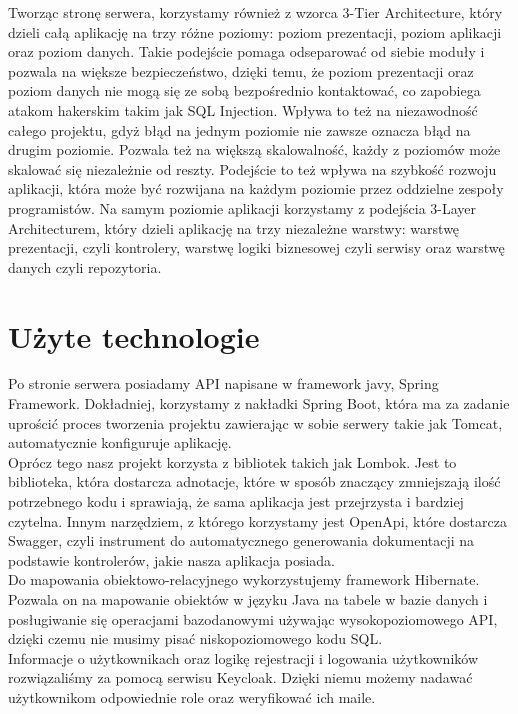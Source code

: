 \documentclass{article}
\begin{document}
Tworząc stronę serwera, korzystamy również z wzorca 3-Tier Architecture, który dzieli całą aplikację na trzy różne poziomy: poziom prezentacji, poziom aplikacji oraz poziom danych. Takie podejście pomaga odseparować od siebie moduły i pozwala na większe bezpieczeństwo, dzięki temu, że poziom prezentacji oraz poziom danych nie mogą się ze sobą bezpośrednio kontaktować, co zapobiega atakom hakerskim takim jak SQL Injection. Wpływa to też na niezawodność całego projektu, gdyż błąd na jednym poziomie nie zawsze oznacza błąd na drugim poziomie. Pozwala też na większą skalowalność, każdy z poziomów może skalować się niezależnie od reszty. Podejście to też wpływa na szybkość rozwoju aplikacji, która może być rozwijana na każdym poziomie przez oddzielne zespoły programistów. Na samym poziomie aplikacji korzystamy z podejścia 3-Layer Architecturem, który dzieli aplikację na trzy niezależne warstwy: warstwę prezentacji, czyli kontrolery, warstwę logiki biznesowej czyli serwisy oraz warstwę danych czyli repozytoria.

\section{Użyte technologie}

Po stronie serwera posiadamy API napisane w framework javy, Spring Framework. Dokładniej, korzystamy z nakładki Spring Boot, która ma za zadanie uprościć proces tworzenia projektu zawierając w sobie serwery takie jak Tomcat, automatycznie konfiguruje aplikację.
\\

Oprócz tego nasz projekt korzysta z bibliotek takich jak Lombok. Jest to biblioteka, która dostarcza adnotacje, które w sposób znaczący zmniejszają ilość potrzebnego kodu i sprawiają, że sama aplikacja jest przejrzysta i bardziej czytelna. Innym narzędziem, z którego korzystamy jest OpenApi, które dostarcza Swagger, czyli instrument do automatycznego generowania dokumentacji na podstawie kontrolerów, jakie nasza aplikacja posiada.
\\

Do mapowania obiektowo-relacyjnego wykorzystujemy framework Hibernate. Pozwala on na mapowanie obiektów w języku Java na tabele w bazie danych i posługiwanie się operacjami bazodanowymi używając wysokopoziomowego API, dzięki czemu nie musimy pisać niskopoziomowego kodu SQL. 
\\

Informacje o użytkownikach oraz logikę rejestracji i logowania użytkowników rozwiązaliśmy za pomocą serwisu Keycloak. Dzięki niemu możemy nadawać użytkownikom odpowiednie role oraz weryfikować ich maile.
\\
\end{document}
